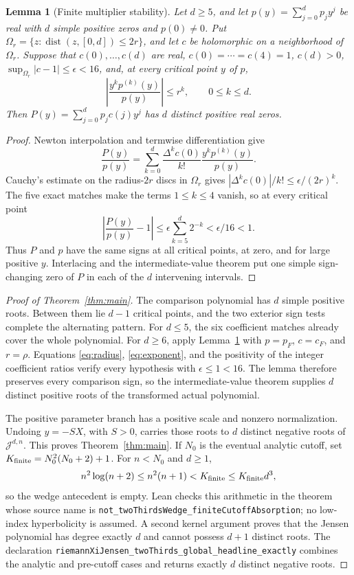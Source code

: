 \documentclass[11pt]{article}
\newtheorem{lemma}[theorem]{Lemma}
\theoremstyle{definition}
\theoremstyle{remark}
\newcommand{\J}{\mathcal J}
\begin{document}
\begin{lemma}[Finite multiplier stability]\label{lem:stability}
Let $d\ge5$, and let $p(y)=\sum_{j=0}^dp_jy^j$ be real with $d$ simple
positive zeros and $p(0)\ne0$.  Put
$\Omega_r=\{z:\operatorname{dist}(z,[0,d])\le2r\}$, and let $c$ be
holomorphic on a neighborhood of $\Omega_r$.  Suppose that
$c(0),\ldots,c(d)$ are real,
$c(0)=\cdots=c(4)=1$, $c(d)>0$,
$\sup_{\Omega_r}|c-1|\le\epsilon<16$, and, at every critical point $y$ of
$p$,
\[
 \left|\frac{y^kp^{(k)}(y)}{p(y)}\right|\le r^k,
 \qquad0\le k\le d.
\]
Then $P(y)=\sum_{j=0}^dp_jc(j)y^j$ has $d$ distinct positive real zeros.
\end{lemma}

\begin{proof}
Newton interpolation and termwise differentiation give
\[
 \frac{P(y)}{p(y)}
 =\sum_{k=0}^d\frac{\Delta^kc(0)}{k!}
   \frac{y^kp^{(k)}(y)}{p(y)}.
\]
Cauchy's estimate on the radius-$2r$ discs in $\Omega_r$ gives
$|\Delta^kc(0)|/k!\le\epsilon/(2r)^k$.  The five exact matches make the
terms $1\le k\le4$ vanish, so at every critical point
\[
 \left|\frac{P(y)}{p(y)}-1\right|
 \le\epsilon\sum_{k=5}^d2^{-k}<\epsilon/16<1.
\]
Thus $P$ and $p$ have the same signs at all critical points, at zero, and
for large positive $y$.  Interlacing and the intermediate-value theorem put
one simple sign-changing zero of $P$ in each of the $d$ intervening
intervals.
\end{proof}

\begin{proof}[Proof of Theorem~\ref{thm:main}]
The comparison polynomial has $d$ simple positive roots.  Between them lie
$d-1$ critical points, and the two exterior sign tests complete the
alternating pattern.  For $d\le5$, the six coefficient matches already cover
the whole polynomial.  For $d\ge6$, apply Lemma~\ref{lem:stability} with
$p=p_F$, $c=c_F$, and $r=\rho$.  Equations \eqref{eq:radius},
\eqref{eq:exponent}, and the positivity of the integer coefficient ratios
verify every hypothesis with $\epsilon\le1<16$.  The lemma therefore
preserves every comparison sign, so the
intermediate-value theorem supplies $d$ distinct positive roots of the
transformed actual polynomial.

The positive parameter branch has a positive scale and nonzero
normalization.  Undoing $y=-SX$, with $S>0$, carries those roots to $d$
distinct negative roots of $\J^{d,n}$.  This proves
Theorem~\ref{thm:main}.  If $N_0$ is the eventual analytic cutoff, set
$K_{\rm finite}=N_0^2(N_0+2)+1$.  For $n<N_0$ and $d\ge1$,
\[
 n^2\log(n+2)\le n^2(n+1)<K_{\rm finite}\le K_{\rm finite}d^3,
\]
so the wedge antecedent is empty.  Lean checks this arithmetic in the theorem
whose source name is
\texttt{not\_twoThirdsWedge\_finiteCutoffAbsorption}; no low-index
hyperbolicity is assumed.  A second kernel argument proves that the Jensen
polynomial has degree exactly $d$ and cannot possess $d+1$ distinct roots.
The declaration
\texttt{riemannXiJensen\_twoThirds\_global\_headline\_exactly} combines the
analytic and pre-cutoff cases and returns exactly $d$ distinct negative roots.
\end{proof}
\end{document}
